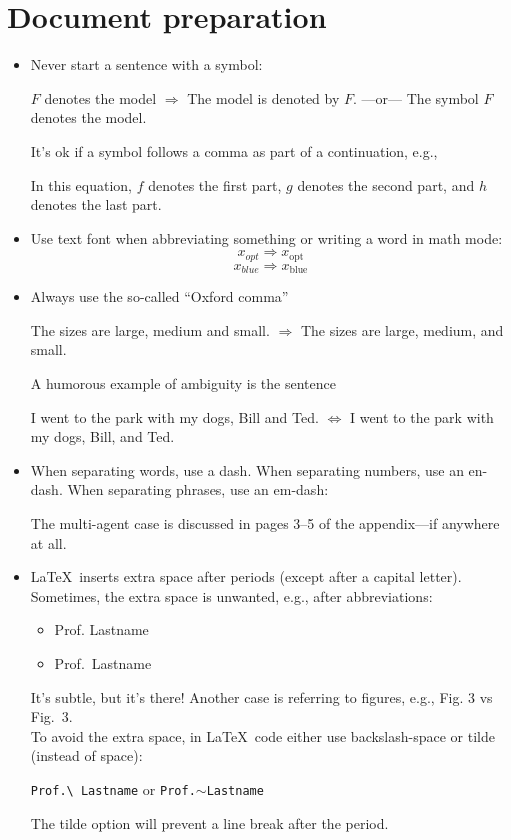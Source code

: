 \documentclass[11pt]{article}
\begin{document}
\section*{Document preparation}

\begin{itemize}

\item Never start a sentence with a symbol:
\begin{center}
$F$ denotes the model $\Rightarrow$ The model is denoted by $F$. ---or--- The symbol $F$ denotes the model.
\end{center}
It's ok if a symbol follows a comma as part of a continuation, e.g.,
\begin{center}
In this equation, $f$ denotes the first part, $g$ denotes the second part, and $h$ denotes the last part.
\end{center}

\item Use text font when abbreviating something or writing a word in math mode:
$$x_{opt} \Rightarrow x_\mathrm{opt}$$
$$x_{blue} \Rightarrow x_\mathrm{blue}$$

\item Always use the so-called ``Oxford comma''
\begin{center}
The sizes are large, medium and small. $\Rightarrow$ The sizes are large, medium, and small.
\end{center}
A humorous example of ambiguity is the sentence
\begin{center}
I went to the park with my dogs, Bill and Ted. $\Leftrightarrow$ I went to the park with my dogs, Bill, and Ted.
\end{center}

\item When separating words, use a dash. When separating numbers, use an en-dash. When separating phrases, use an em-dash:
\begin{center}
The multi-agent case is discussed in pages 3--5 of the appendix---if anywhere at all.
\end{center}

\item \LaTeX\  inserts extra space after periods (except after a capital letter). Sometimes, the extra space is unwanted, e.g., after abbreviations:
\begin{itemize}
\item Prof. Lastname
\item Prof.\ Lastname
\end{itemize}
It's subtle, but it's there! Another case is referring to figures, e.g., Fig. 3 vs Fig.\ 3.\\
To avoid the extra space, in \LaTeX\ code either use backslash-space or tilde (instead of space):
\begin{center}
\texttt{Prof.\textbackslash\ Lastname} or 
\texttt{Prof.$\sim$Lastname}
\end{center}
The tilde option will prevent a line break after the period.


\end{itemize}
\end{document}
